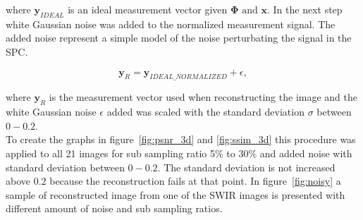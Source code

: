 where $\mathbf{y}_{IDEAL}$ is an ideal measurement vector given $\mathbf{\Phi} \text{ and } \mathbf{x}$. In the next step white Gaussian noise was added to the normalized measurement signal. The added noise represent a simple model of the noise perturbating the signal in the SPC.

\begin{equation}
\mathbf{y}_R = \mathbf{y}_{IDEAL\_NORMALIZED} + \epsilon,
\end{equation}

where $\mathbf{y}_R$ is the measurement vector used when reconstructing the image and the white Gaussian noise $\epsilon$ added was scaled with the standard deviation $\sigma$ between $0 - 0.2$. \\[0.1in] 

To create the graphs in figure~\ref{fig:psnr_3d} and \ref{fig:ssim_3d} this procedure was applied to all 21 images for sub sampling ratio 5\% to 30\% and added noise with standard deviation between $0 - 0.2$. The standard deviation is not increased above $0.2$ because the reconstruction fails at that point. In figure~\ref{fig:noisy} a sample of reconstructed image from one of the SWIR images is presented with different amount of noise and sub sampling ratios.




